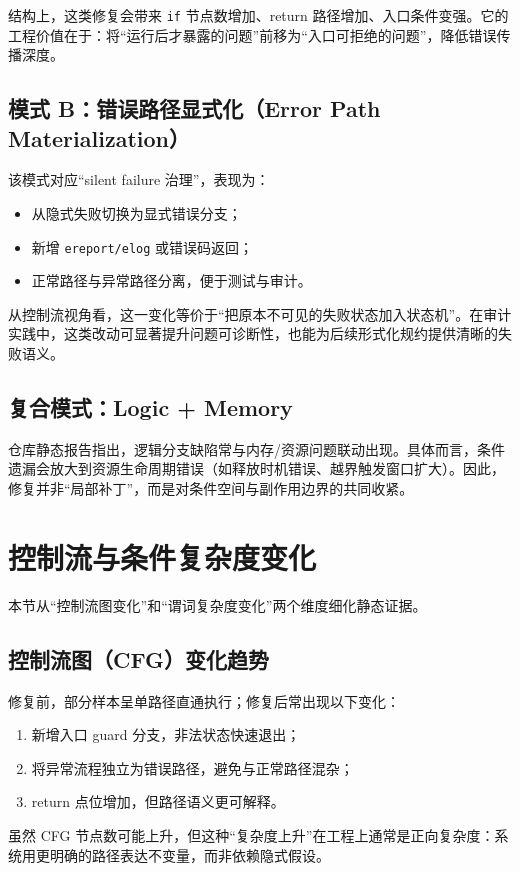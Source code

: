 结构上，这类修复会带来 \texttt{if} 节点数增加、return 路径增加、入口条件变强。它的工程价值在于：将“运行后才暴露的问题”前移为“入口可拒绝的问题”，降低错误传播深度。

\subsection*{模式 B：错误路径显式化（Error Path Materialization）}
该模式对应“silent failure 治理”，表现为：
\begin{itemize}
    \item 从隐式失败切换为显式错误分支；
    \item 新增 \texttt{ereport/elog} 或错误码返回；
    \item 正常路径与异常路径分离，便于测试与审计。
\end{itemize}

从控制流视角看，这一变化等价于“把原本不可见的失败状态加入状态机”。在审计实践中，这类改动可显著提升问题可诊断性，也能为后续形式化规约提供清晰的失败语义。

\subsection*{复合模式：Logic + Memory}
仓库静态报告指出，逻辑分支缺陷常与内存/资源问题联动出现。具体而言，条件遗漏会放大到资源生命周期错误（如释放时机错误、越界触发窗口扩大）。因此，修复并非“局部补丁”，而是对条件空间与副作用边界的共同收紧。

\section{控制流与条件复杂度变化}
本节从“控制流图变化”和“谓词复杂度变化”两个维度细化静态证据。

\subsection*{控制流图（CFG）变化趋势}
修复前，部分样本呈单路径直通执行；修复后常出现以下变化：
\begin{enumerate}
    \item 新增入口 guard 分支，非法状态快速退出；
    \item 将异常流程独立为错误路径，避免与正常路径混杂；
    \item return 点位增加，但路径语义更可解释。
\end{enumerate}

虽然 CFG 节点数可能上升，但这种“复杂度上升”在工程上通常是正向复杂度：系统用更明确的路径表达不变量，而非依赖隐式假设。

